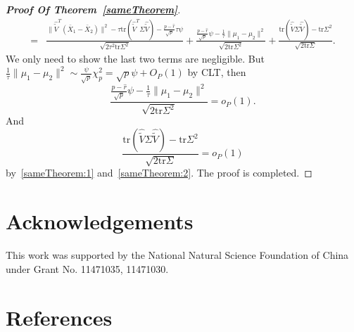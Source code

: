 \documentclass[review]{elsarticle}
\theoremstyle{plain}
\theoremstyle{definition}
\theoremstyle{remark}
\begin{document}
\begin{proof}[\textbf{Proof Of Theorem~\ref{sameTheorem}}]
\begin{equation*}
\begin{aligned}
            =&
        \frac{\|\hat{\tilde{V}}^T(\bar{X}_1-\bar{X}_2)\|^2-\tau\mathrm{tr}(\hat{\tilde{V}}^T\Sigma\hat{\tilde{V}})-\frac{p-\hat{r}}{\sqrt{p}}\tau \psi }{\sqrt{2\tau^2\mathrm{tr}\Sigma^2}}
           + 
            \frac{\frac{p-\hat{r}}{\sqrt{p}}\psi-\frac{1}{\tau}\|\mu_1-\mu_2\|^2}{\sqrt{2\mathrm{tr}\Sigma^2}}
            +
            \frac{\mathrm{tr}(\hat{\tilde{V}}\Sigma\hat{\tilde{V}})-\mathrm{tr}\Sigma^2}{\sqrt{2\mathrm{tr}\Sigma}}.
        \end{aligned}
    \end{equation*}
We only need to show the last two terms are negligible.
But $\frac{1}{\tau}\|\mu_1-\mu_2\|^2\sim \frac{\psi}{\sqrt{p}}\chi^2_p=\sqrt{p}\psi+O_P(1)$ by CLT, then
$$
            \frac{\frac{p-\hat{r}}{\sqrt{p}}\psi-\frac{1}{\tau}\|\mu_1-\mu_2\|^2}{\sqrt{2\mathrm{tr}\Sigma^2}}=o_P(1).
$$
And 
            $$
            \frac{\mathrm{tr}(\hat{\tilde{V}}\Sigma\hat{\tilde{V}})-\mathrm{tr}\Sigma^2}{\sqrt{2\mathrm{tr}\Sigma}}=o_P(1)
            $$
            by~\eqref{sameTheorem:1} and~\eqref{sameTheorem:2}. The proof is completed.




\end{proof}









\section*{Acknowledgements}
This work was supported by the National Natural Science Foundation of China under Grant No. 11471035, 11471030.


\section*{References}


\end{document}
